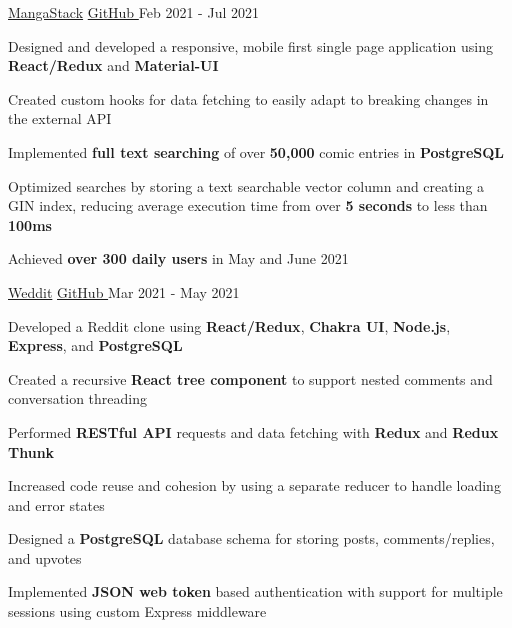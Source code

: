 
\begin{cventries}
  \cventry
    {\fontsize{10pt}{1em}\bodyfont\upshape{}} %
    {\href{https://mangastack.cf/}{MangaStack}} %
    {\href{https://github.com/tacticaltofu/mangastack}{GitHub \faExternalLink}} %
    {Feb 2021 - Jul 2021} %
    {
      \begin{cvitems} %
        \item {Designed and developed a responsive, mobile first single page application using \textbf{React/Redux} and \textbf{Material-UI}}
        \item {Created custom hooks for data fetching to easily adapt to breaking changes in the external API}
        \item {Implemented \textbf{full text searching} of over \textbf{50,000} comic entries in \textbf{PostgreSQL}}
        \item {Optimized searches by storing a text searchable vector column and creating a GIN index, reducing average execution time from over \textbf{5 seconds} to less than \textbf{100ms}}
        \item {Achieved \textbf{over 300 daily users} in May and June 2021}
      \end{cvitems}
    }
    
  \cventry
    {\fontsize{10pt}{1em}\bodyfont\upshape{}} %
    {\href{https://weddit.netlify.app/}{Weddit}} %
    {\href{https://github.com/tacticaltofu/reddit-clone}{GitHub \faExternalLink}} %
    {Mar 2021 - May 2021} %
    {
      \begin{cvitems} %
        \item {Developed a Reddit clone using \textbf{React/Redux}, \textbf{Chakra UI}, \textbf{Node.js}, \textbf{Express}, and \textbf{PostgreSQL}}
        \item {Created a recursive \textbf{React tree component} to support nested comments and conversation threading}
        \item {Performed \textbf{RESTful API} requests and data fetching with \textbf{Redux} and \textbf{Redux Thunk}}
        \item {Increased code reuse and cohesion by using a separate reducer to handle loading and error states}
        \item {Designed a \textbf{PostgreSQL} database schema for storing posts, comments/replies, and upvotes}
        \item {Implemented \textbf{JSON web token} based authentication with support for multiple sessions using custom Express middleware}
      \end{cvitems}
    }
\end{cventries}
